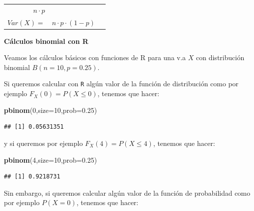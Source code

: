 \documentclass[]{book}
\newenvironment{Shaded}{\begin{snugshade}}{\end{snugshade}}
\newcommand{\DataTypeTok}[1]{\textcolor[rgb]{0.13,0.29,0.53}{#1}}
\newcommand{\DecValTok}[1]{\textcolor[rgb]{0.00,0.00,0.81}{#1}}
\newcommand{\FloatTok}[1]{\textcolor[rgb]{0.00,0.00,0.81}{#1}}
\newcommand{\KeywordTok}[1]{\textcolor[rgb]{0.13,0.29,0.53}{\textbf{#1}}}
\newcommand{\NormalTok}[1]{#1}
\begin{document}
\begin{longtable}[]{@{}rll@{}}
\begin{minipage}[t]{0.26\columnwidth}
\(n\cdot p\)\strut
\end{minipage} & \begin{minipage}[t]{0.24\columnwidth}\raggedright
\strut
\end{minipage}\tabularnewline
\begin{minipage}[t]{0.41\columnwidth}\raggedleft
\(Var(X)=\)\strut
\end{minipage} & \begin{minipage}[t]{0.26\columnwidth}\raggedright
\(n\cdot p \cdot (1-p)\)\strut
\end{minipage} & \begin{minipage}[t]{0.24\columnwidth}\raggedright
\strut
\end{minipage}\tabularnewline
\bottomrule
\end{longtable}

\textbf{Cálculos binomial con R}

Veamos los cálculos básicos con funciones de R para una v.a \(X\) con distribución binomial \(B(n=10,p=0.25)\).

Si queremos calcular con \texttt{R} algún valor de la función de distribución como por ejemplo \(F_X(0)=P(X\leq 0)\), tenemos que hacer:

\begin{Shaded}
\begin{Highlighting}[]
\KeywordTok{pbinom}\NormalTok{(}\DecValTok{0}\NormalTok{,}\DataTypeTok{size=}\DecValTok{10}\NormalTok{,}\DataTypeTok{prob=}\FloatTok{0.25}\NormalTok{)}
\end{Highlighting}
\end{Shaded}

\begin{verbatim}
## [1] 0.05631351
\end{verbatim}

y si queremos por ejemplo \(F_X(4)=P(X\leq 4)\), tenemos que hacer:

\begin{Shaded}
\begin{Highlighting}[]
\KeywordTok{pbinom}\NormalTok{(}\DecValTok{4}\NormalTok{,}\DataTypeTok{size=}\DecValTok{10}\NormalTok{,}\DataTypeTok{prob=}\FloatTok{0.25}\NormalTok{)}
\end{Highlighting}
\end{Shaded}

\begin{verbatim}
## [1] 0.9218731
\end{verbatim}

Sin embargo, si queremos calcular algún valor de la función de probabilidad como por ejemplo \(P(X=0)\), tenemos que hacer:
\end{document}
